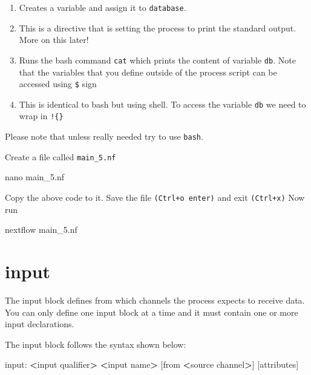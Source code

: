 \documentclass[
]{book}
\newenvironment{Shaded}{\begin{snugshade}}{\end{snugshade}}
\newcommand{\ExtensionTok}[1]{#1}
\newcommand{\FunctionTok}[1]{\textcolor[rgb]{0.00,0.00,0.00}{#1}}
\newcommand{\NormalTok}[1]{#1}
\newcommand{\OperatorTok}[1]{\textcolor[rgb]{0.81,0.36,0.00}{\textbf{#1}}}
\providecommand{\tightlist}{%
  \setlength{\itemsep}{0pt}\setlength{\parskip}{0pt}}
\begin{document}
\begin{enumerate}
\def\labelenumi{\arabic{enumi}.}
\tightlist
\item
  Creates a variable and assign it to \texttt{database}.
\item
  This is a directive that is setting the process to print the standard output. More on this later!
\item
  Runs the bash command \texttt{cat} which prints the content of variable \texttt{db}. Note that the variables that you define outside of the process script can be accessed using \texttt{\$} sign
\item
  This is identical to bash but using shell. To access the variable \texttt{db} we need to wrap in \texttt{!\{\}}
\end{enumerate}

Please note that unless really needed try to use \texttt{bash}.

Create a file called \texttt{main\_5.nf}

\begin{Shaded}
\begin{Highlighting}[numbers=left,,]
\FunctionTok{nano}\NormalTok{ main\_5.nf}
\end{Highlighting}
\end{Shaded}

Copy the above code to it. Save the file \texttt{(Ctrl+o\ enter)} and exit \texttt{(Ctrl+x)}
Now run

\begin{Shaded}
\begin{Highlighting}[numbers=left,,]
\ExtensionTok{nextflow}\NormalTok{ main\_5.nf}
\end{Highlighting}
\end{Shaded}

\hypertarget{input}{%
\section{input}\label{input}}

The input block defines from which channels the process expects to receive data. You can only define one input block at a time and it must contain one or more input declarations.

The input block follows the syntax shown below:

\begin{Shaded}
\begin{Highlighting}[numbers=left,,]
\ExtensionTok{input:}
  \OperatorTok{\textless{}}\NormalTok{input }\ExtensionTok{qualifier}\OperatorTok{\textgreater{}} \OperatorTok{\textless{}}\NormalTok{input name}\OperatorTok{\textgreater{}}\NormalTok{ [from }\OperatorTok{\textless{}}\NormalTok{source channel}\OperatorTok{\textgreater{}}\NormalTok{] [attributes]}
\end{Highlighting}
\end{Shaded}
\end{document}
